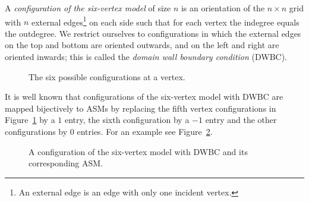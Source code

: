 A \emph{configuration of the six-vertex model} of size $n$ is an orientation of the $n \times n$ grid with $n$ external edges\footnote{An external edge is an edge with only one incident vertex.} on each side such that for each vertex the indegree equals the outdegree. We restrict ourselves to configurations in which the external edges on the top and bottom are oriented outwards, and on the left and right are oriented inwards; this is called the \emph{domain wall boundary condition} (DWBC). 
\begin{figure}
\begin{center}
\caption{\label{fig: 6-vert} The six possible configurations at a vertex.} 
\end{center}
\end{figure}
It is well known that configurations of the six-vertex model with DWBC are mapped bijectively to ASMs by replacing the fifth vertex configurations in Figure~\ref{fig: 6-vert} by a $1$ entry, the sixth configuration by a $-1$ entry and the other configurations by $0$ entries. For an example see Figure~\ref{fig: asm to 6vert}.
\begin{figure}
\begin{center}
\end{center}
\caption{\label{fig: asm to 6vert} A configuration of the six-vertex model with DWBC and its corresponding ASM.}
\end{figure}
